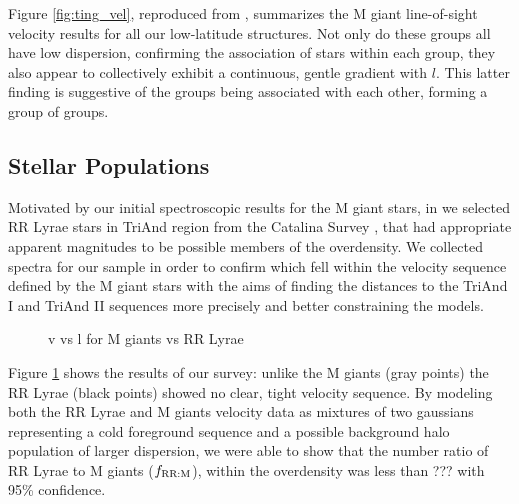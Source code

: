 \documentclass[galaxies,article,submit,moreauthors,pdftex,10pt,a4paper]{mdpi}
\begin{document}
Figure \ref{fig:ting_vel}, reproduced from \cite{li17}, summarizes the M giant line-of-sight velocity results for all our low-latitude structures.
Not only do these groups all have low dispersion, confirming the association of stars within each group, they also appear to collectively exhibit a continuous, gentle gradient with $l$.
This latter finding is suggestive of the groups being associated with each other, forming a group of groups.


\subsection{Stellar Populations}

Motivated by our initial spectroscopic results for the M giant stars, in \cite{pricewhelan15} we selected RR Lyrae stars in TriAnd region from the Catalina Survey \citep{drake14}, that had appropriate apparent magnitudes to be possible members of the overdensity.
We collected spectra for our sample in order to confirm which fell within the velocity sequence defined by the M giant stars with the aims of finding the distances to the TriAnd I and TriAnd II sequences more precisely and better constraining the models.

\begin{figure}[t]
\centering
\caption{\label{fig:apw}
v vs l for M giants vs RR Lyrae}
\end{figure}

Figure \ref{fig:apw} \citep[reproduced from][]{pricewhelan15} shows the results of our survey: unlike the M giants (gray points) the RR Lyrae (black points) showed no clear, tight velocity sequence.
By modeling both the RR Lyrae and M giants velocity data as mixtures of two gaussians representing a cold foreground sequence and a possible background halo population of larger dispersion, we were able to show that the number ratio of RR Lyrae to M giants ($f_{\rm RR:M}$), within the overdensity was less than ??? with 95\% confidence.
\end{document}

